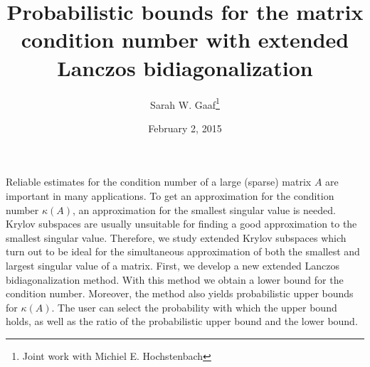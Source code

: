 \documentclass{article}
\title{Probabilistic bounds for the matrix condition number with extended Lanczos bidiagonalization}
\author{Sarah W. Gaaf\thanks{Joint work with Michiel E. Hochstenbach}}
\affil{PhD student at Eindhoven University of Technology}
\date{February 2, 2015}
\begin{document}
\maketitle
\setcounter{page}{15}
Reliable estimates for the condition number of a large (sparse) matrix $A$ are important in many applications.
To get an approximation for the condition number $\kappa(A)$, an approximation for the smallest
singular value is needed. Krylov subspaces are usually unsuitable for finding a good approximation
to the smallest singular value.
Therefore, we study extended Krylov subspaces which turn out to be ideal for the simultaneous
approximation of both the smallest and largest singular value of a matrix.
First, we develop a new extended Lanczos bidiagonalization method.
With this method we obtain a lower bound for the condition number.
Moreover, the method also yields probabilistic upper bounds for $\kappa(A)$.
The user can select the probability with which the upper bound holds,
as well as the ratio of the probabilistic upper bound and the lower bound.
\end{document}
